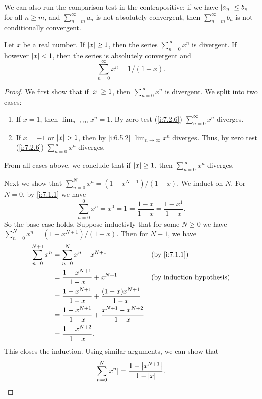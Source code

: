 \begin{note}
  We can also run the comparison test in the contrapositive:
  if we have \(\left\lvert a_n\right\rvert \leq b_n\) for all \(n \geq m\), and \(\sum_{n = m}^\infty a_n\) is not absolutely convergent, then \(\sum_{n = m}^\infty b_n\) is not conditionally convergent.
\end{note}

\begin{lem}\label{i:7.3.3}
  Let \(x\) be a real number.
  If \(\left\lvert x\right\rvert \geq 1\), then the series \(\sum_{n = 0}^\infty x^n\) is divergent.
  If however \(\left\lvert x\right\rvert < 1\), then the series is absolutely convergent and
  \[
    \sum_{n = 0}^\infty x^n = 1 / (1 - x).
  \]
\end{lem}

\begin{proof}
  We first show that if \(\left\lvert x\right\rvert \geq 1\), then \(\sum_{n = 0}^\infty x^n\) is divergent.
  We split into two cases:
  \begin{enumerate}
    \item If \(x = 1\), then \(\lim_{n \to \infty} x^n = 1\). By zero test (\cref{i:7.2.6}) \(\sum_{n = 0}^\infty x^n\) diverges.
    \item If \(x = -1\) or \(\left\lvert x\right\rvert > 1\), then by \cref{i:6.5.2} \(\lim_{n \to \infty} x^n\) diverges.
          Thus, by zero test (\cref{i:7.2.6}) \(\sum_{n = 0}^\infty x^n\) diverges.
  \end{enumerate}
  From all cases above, we conclude that if \(\left\lvert x\right\rvert \geq 1\), then \(\sum_{n = 0}^\infty x^n\) diverges.

  Next we show that \(\sum_{n = 0}^N x^n = (1 - x^{N + 1}) / (1 - x)\).
  We induct on \(N\).
  For \(N = 0\), by \cref{i:7.1.1} we have
  \[
    \sum_{n = 0}^0 x^n = x^0 = 1 = \dfrac{1 - x}{1 - x} = \dfrac{1 - x^1}{1 - x}.
  \]
  So the base case holds.
  Suppose inductivly that for some \(N \geq 0\) we have \(\sum_{n = 0}^N x^n = (1 - x^{N + 1}) / (1 - x)\).
  Then for \(N + 1\), we have
  \begin{align*}
    \sum_{n = 0}^{N + 1} x^n & = \sum_{n = 0}^N x^n + x^{N + 1}                                      &  & \by{i:7.1.1} \\
                             & = \dfrac{1 - x^{N + 1}}{1 - x} + x^{N + 1}                            &  & \byIH        \\
                             & = \dfrac{1 - x^{N + 1}}{1 - x} + \dfrac{(1 - x) x^{N + 1}}{1 - x}                       \\
                             & = \dfrac{1 - x^{N + 1}}{1 - x} + \dfrac{x^{N + 1} - x^{N + 2}}{1 - x}                   \\
                             & = \dfrac{1 - x^{N + 2}}{1 - x}.
  \end{align*}
  This closes the induction.
  Using similar arguments, we can show that
  \[
    \sum_{n = 0}^N \abs{x^n} = \dfrac{1 - \abs{x^{N + 1}}}{1 - \abs{x}}.
  \]


\end{proof}

